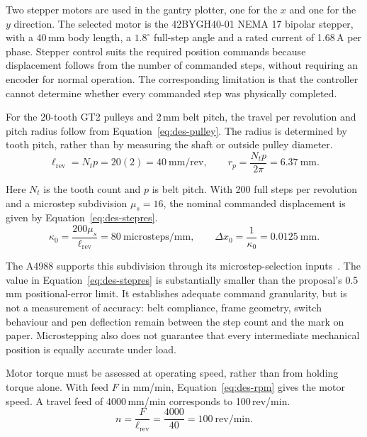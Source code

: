 Two stepper motors are used in the gantry plotter, one for the $x$ and one for the $y$ direction. The selected motor is the 42BYGH40-01 NEMA 17 bipolar stepper, with a 40\,mm body length, a $1.8^\circ$ full-step angle and a rated current of 1.68\,A per phase. Stepper control suits the required position commands because displacement follows from the number of commanded steps, without requiring an encoder for normal operation. The corresponding limitation is that the controller cannot determine whether every commanded step was physically completed.~\cite[hardware clarifications; reproduce.py]{brauneevidence2026,braunepipeline2026}

For the 20-tooth GT2 pulleys and 2\,mm belt pitch, the travel per revolution and pitch radius follow from Equation~\ref{eq:des-pulley}. The radius is determined by tooth pitch, rather than by measuring the shaft or outside pulley diameter.
\cite[hardware clarifications]{brauneevidence2026}
\begin{equation}
\ell_{\mathrm{rev}}=N_t p=20(2)=40\ \mathrm{mm/rev},\qquad
r_p=\frac{N_t p}{2\pi}=6.37\ \mathrm{mm}.
\label{eq:des-pulley}
\end{equation}

Here $N_t$ is the tooth count and $p$ is belt pitch. With 200 full steps per revolution and a microstep subdivision $\mu_s=16$, the nominal commanded displacement is given by Equation~\ref{eq:des-stepres}.
\cite[hardware clarifications]{brauneevidence2026}
\begin{equation}
\kappa_0=\frac{200\mu_s}{\ell_{\mathrm{rev}}}=80\ \mathrm{microsteps/mm},\qquad
\Delta x_0=\frac{1}{\kappa_0}=0.0125\ \mathrm{mm}.
\label{eq:des-stepres}
\end{equation}

The A4988 supports this subdivision through its microstep-selection inputs~\cite[p.~6, Table~1]{a4988ds}. The value in Equation~\ref{eq:des-stepres} is substantially smaller than the proposal's 0.5\,mm positional-error limit. It establishes adequate command granularity, but is not a measurement of accuracy: belt compliance, frame geometry, switch behaviour and pen deflection remain between the step count and the mark on paper. Microstepping also does not guarantee that every intermediate mechanical position is equally accurate under load.~\cite[hardware clarifications; reproduce.py]{brauneevidence2026,braunepipeline2026}

Motor torque must be assessed at operating speed, rather than from holding torque alone. With feed $F$ in mm/min, Equation~\ref{eq:des-rpm} gives the motor speed. A travel feed of 4000\,mm/min corresponds to 100\,rev/min.
\cite[reproduce.py, GantryConfig]{braunepipeline2026}
\begin{equation}
n=\frac{F}{\ell_{\mathrm{rev}}}=\frac{4000}{40}=100\ \mathrm{rev/min}.
\label{eq:des-rpm}
\end{equation}

